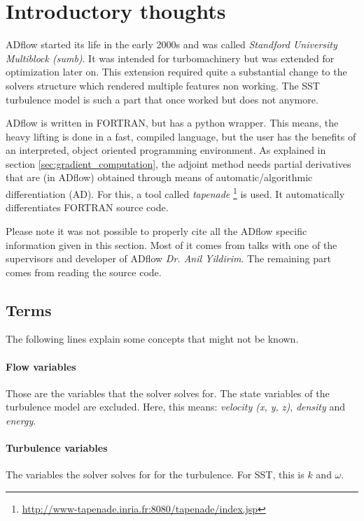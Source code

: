 \section{Introductory thoughts}
ADflow started its life in the early 2000s and was called \textit{Standford
University Multiblock (sumb)}. It was intended for turbomachinery but was
extended for optimization later on. This extension required quite a
substantial change to the solvers structure which rendered multiple features
non working. The SST turbulence model is such a part that once worked but does
not anymore.

ADflow is written in FORTRAN, but has a python wrapper. This means, the heavy
lifting is done in a fast, compiled language, but the user has the benefits of
an interpreted, object oriented programming environment. As explained in
section \ref{sec:gradient_computation}, the adjoint method needs partial
derivatives that are (in ADflow) obtained through means of
automatic/algorithmic differentiation (AD). For this, a tool called
\textit{tapenade}
\footnote{\url{http://www-tapenade.inria.fr:8080/tapenade/index.jsp}} is used.
It automatically differentiates FORTRAN source code.

Please note it was not possible to properly cite all the ADflow specific
information given in this section. Most of it comes from talks with one of the
supervisors and developer of ADflow \textit{Dr. Anil Yildirim}. The remaining
part comes from reading the source code.




\subsection{Terms}
The following lines explain some concepts that might not be known.

\paragraph{Flow variables} Those are the variables that the solver solves for.
The state variables of the turbulence model are excluded. Here, this means:
\textit{velocity (x, y, z)}, \textit{density} and \textit{energy}.

\paragraph{Turbulence variables} The variables the solver solves for for the
turbulence. For SST, this is $k$ and $\omega$.

